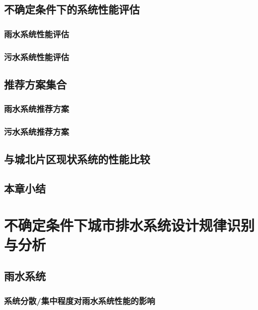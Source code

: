 \documentclass[degree=doctor]{sysuthesis}
\begin{document}
\section{不确定条件下的系统性能评估}
\subsection{雨水系统性能评估}

\clearpage
\setcounter{page}{130}
\subsection{污水系统性能评估}

\clearpage
\setcounter{page}{134}
\section{推荐方案集合}
\subsection{雨水系统推荐方案}

\clearpage
\setcounter{page}{135}
\subsection{污水系统推荐方案}

\clearpage
\setcounter{page}{137}
\section{与城北片区现状系统的性能比较}

\clearpage
\setcounter{page}{139}
\section{本章小结}


\clearpage
\setcounter{page}{141}
\chapter{不确定条件下城市排水系统设计规律识别与分析}
\section{雨水系统}
\subsection{系统分散/集中程度对雨水系统性能的影响}
\end{document}
